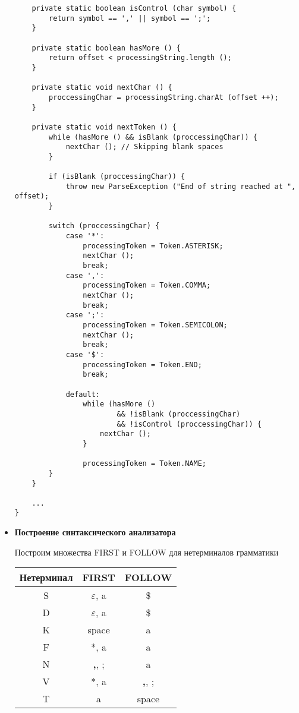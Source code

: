 \documentclass[12pt]{article}
\begin{document}
\begin{itemize}
\begin{verbatim}
    private static boolean isControl (char symbol) {
        return symbol == ',' || symbol == ';';
    }
    
    private static boolean hasMore () {
        return offset < processingString.length ();
    }
    
    private static void nextChar () {
        proccessingChar = processingString.charAt (offset ++);
    }
    
    private static void nextToken () {
        while (hasMore () && isBlank (proccessingChar)) {
            nextChar (); // Skipping blank spaces
        }
        
        if (isBlank (proccessingChar)) {
            throw new ParseException ("End of string reached at ", offset);
        }
        
        switch (proccessingChar) {
            case '*':
                processingToken = Token.ASTERISK;
                nextChar ();
                break;
            case ',':
                processingToken = Token.COMMA;
                nextChar ();
                break;
            case ';':
                processingToken = Token.SEMICOLON;
                nextChar ();
                break;
            case '$':
                processingToken = Token.END;
                break;
            
            default:
                while (hasMore () 
                        && !isBlank (proccessingChar)
                        && !isControl (proccessingChar)) {
                    nextChar ();
                }
                
                processingToken = Token.NAME;
        }
    }
    
    ...
}
        \end{verbatim}

    \item \textbf{Построение синтаксического анализатора}

        Построим множества FIRST и FOLLOW для нетерминалов грамматики

        \begin{tabular} {|c|c|c|}
            \hline
                \textbf{Нетерминал} & \textbf{FIRST} & \textbf{FOLLOW} \\
            \hline
                S & $\varepsilon$,  a & \$ \\
            \hline
                D & $\varepsilon$, a & \$ \\
            \hline
                K & space & a \\
            \hline
                F & *, a & a \\
            \hline
                N & \textbf{,}, ; & a \\
            \hline
                V & *, a & \textbf{,}, ; \\
            \hline
                T & a & space \\
            \hline
        \end{tabular}



\end{itemize}
\end{document}

